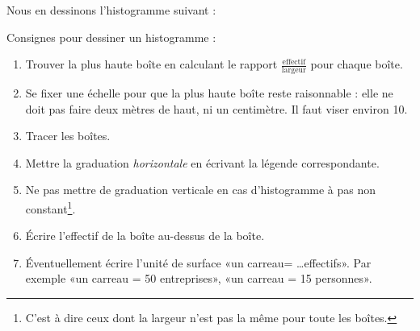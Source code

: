 Nous en dessinons l'histogramme suivant :
\begin{center}
   
\end{center}


Consignes pour dessiner un histogramme :
\begin{enumerate}
    \item
        Trouver la plus haute boîte en calculant le rapport \( \frac{ \text{effectif} }{ \text{largeur} }\) pour chaque boîte.
    \item
        Se fixer une échelle pour que la plus haute boîte reste raisonnable : elle ne doit pas faire deux mètres de haut, ni un centimètre. Il faut viser environ \unit{10}{\centi\meter}.
    \item
        Tracer les boîtes.
    \item
        Mettre la graduation \emph{horizontale} en écrivant la légende correspondante.
    \item
        Ne pas mettre de graduation verticale en cas d'histogramme à pas non constant\footnote{C'est à dire ceux dont la largeur n'est pas la même pour toute les boîtes.}.
    \item
        Écrire l'effectif de la boîte au-dessus de la boîte.
    \item
        Éventuellement écrire l'unité de surface «un carreau= \ldots effectifs». Par exemple «un carreau = 50 entreprises», «un carreau = 15 personnes».
\end{enumerate}



